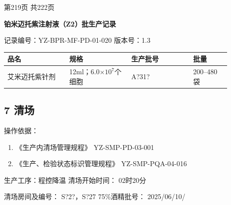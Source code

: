 \documentclass[UTF8,10pt,a4paper,fontset=fandol]{ctexart}
\newcommand{\fieldvalue}[1]{#1}
\newcommand{\handwritten}[1]{#1}
\begin{document}
\begin{center}
第219页 共222页
\end{center}

\newpage

\begin{center}
\textbf{铂米迈托紫注射液（Z2）批生产记录}
\end{center}

\noindent
记录编号：YZ-BPR-MF-PD-01-020 \hfill 版本号：1.3

\begin{tabular}{|p{0.25\linewidth}|p{0.25\linewidth}|p{0.25\linewidth}|p{0.15\linewidth}|}
\hline
品名 & 规格 & 生产批号 & 批量 \\
\hline
艾米迈托紫针剂 & 12ml；6.0$\times 10^7$个细胞 &
\fieldvalue{\handwritten{A?31?}} &
200--480袋 \\
\hline
\end{tabular}

\subsection*{7 清场}

操作依据：

\begin{enumerate}
\item 《生产内清场管理规程》 \hfill YZ-SMP-PD-03-001
\item 《生产、检验状态标识管理规程》 \hfill YZ-SMP-PQA-04-016
\end{enumerate}

生产工序：程控降温 \hfill 清场开始时间：
\fieldvalue{\handwritten{02时20分}}

\noindent
清场房间及编号：
\fieldvalue{\handwritten{S?2?，S?27}}
\hfill
75\%酒精批号：
\fieldvalue{\handwritten{2025/06/10/}}
\end{document}
